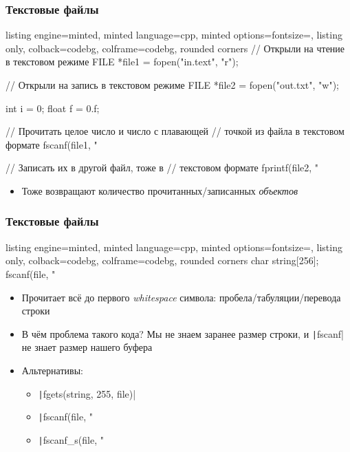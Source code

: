\documentclass[10pt]{beamer}
\begin{document}
\begin{frame}[fragile]
\frametitle{Текстовые файлы}
\begin{tcblisting}{listing engine=minted, minted language=cpp, minted options={fontsize=\scriptsize}, listing only, colback=codebg, colframe=codebg, rounded corners}
// Открыли на чтение в текстовом режиме
FILE *file1 = fopen("in.text", "r");

// Открыли на запись в текстовом режиме
FILE *file2 = fopen("out.txt", "w");

int i = 0;
float f = 0.f;

// Прочитать целое число и число с плавающей
// точкой из файла в текстовом формате
fscanf(file1, "%

// Записать их в другой файл, тоже в 
// текстовом формате
fprintf(file2, "%
\end{tcblisting}
\pause
{}
\begin{itemize}
\item Тоже возвращают количество прочитанных/записанных \textit{объектов}
\end{itemize}
\end{frame}

\begin{frame}[fragile]
\frametitle{Текстовые файлы}
\begin{tcblisting}{listing engine=minted, minted language=cpp, minted options={fontsize=\scriptsize}, listing only, colback=codebg, colframe=codebg, rounded corners}
char string[256];
fscanf(file, "%
\end{tcblisting}
\begin{itemize}
\item Прочитает всё до первого \textit{whitespace} символа: пробела/табуляции/перевода строки
\pause
\item В чём проблема такого кода? \pause Мы не знаем заранее размер строки, и \texttt|fscanf| не знает размер нашего буфера
\pause
\item Альтернативы:
\pause
{}
\begin{itemize}
\item \texttt|fgets(string, 255, file)|
\pause
\item \texttt|fscanf(file, "%
\pause
\item \texttt|fscanf_s(file, "%
\end{itemize}
\end{itemize}
\end{frame}
\end{document}

